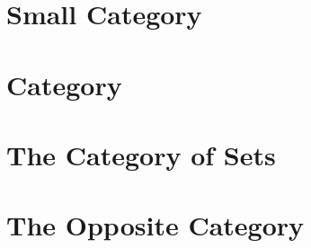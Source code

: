\section{Small Category}
    
\section{Category}
    
\section{The Category of Sets}
    
\section{The Opposite Category}
    
